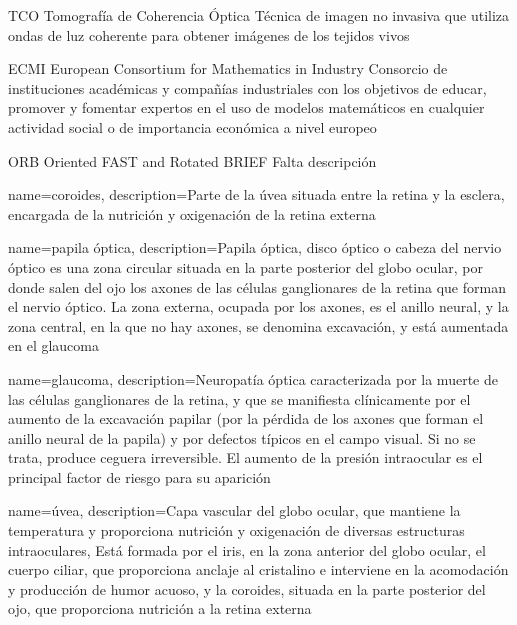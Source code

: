 
  {TCO}            %
  {Tomografía de Coherencia Óptica}  %
  {Técnica de imagen no invasiva que utiliza ondas de luz coherente
    para obtener imágenes de los tejidos vivos} %

  {ECMI}            %
  {European Consortium for Mathematics in Industry}  %
  {Consorcio de instituciones académicas y compañías industriales con
    los objetivos de educar, promover y fomentar expertos en el uso de
    modelos matemáticos en cualquier actividad social o de importancia
    económica a nivel europeo} %

  {ORB} %
  {Oriented FAST and Rotated BRIEF} %
  {Falta descripción} %

{
  name={coroides},
  description={Parte de la úvea situada entre la retina y la esclera,
    encargada de la nutrición y oxigenación de la retina externa}
}

{
  name={papila óptica},
  description={Papila óptica, disco óptico o cabeza del nervio óptico
    es una zona circular situada en la parte posterior del globo
    ocular, por donde salen del ojo los axones de las células
    ganglionares de la retina que forman el nervio óptico. La zona
    externa, ocupada por los axones, es el anillo neural, y la zona
    central, en la que no hay axones, se denomina excavación, y está
    aumentada en el glaucoma}
}

{
  name={glaucoma},
  description={Neuropatía óptica caracterizada por la muerte de las
    células ganglionares de la retina, y que se manifiesta
    clínicamente por el aumento de la excavación papilar (por la
    pérdida de los axones que forman el anillo neural de la papila) y
    por defectos típicos en el campo visual. Si no se trata, produce
    ceguera irreversible. El aumento de la presión intraocular es el
    principal factor de riesgo para su aparición}
}

{
  name={úvea},
  description={Capa vascular del globo ocular, que mantiene la
    temperatura y proporciona nutrición y oxigenación de diversas
    estructuras intraoculares, Está formada por el iris, en la zona
    anterior del globo ocular, el cuerpo ciliar, que proporciona
    anclaje al cristalino e interviene en la acomodación y producción
    de humor acuoso, y la coroides, situada en la parte posterior del
    ojo, que proporciona nutrición a la retina externa}
}

